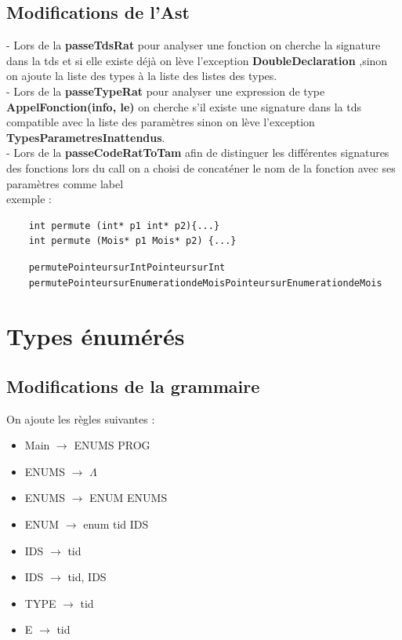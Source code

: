 \documentclass{article}
\begin{document}
\subsection{Modifications de l'Ast}
- Lors de la \textbf{passeTdsRat} pour analyser une fonction on cherche la signature dans la tds et si elle existe déjà on lève l'exception \textbf{DoubleDeclaration}
,sinon on ajoute la liste des types à la liste des listes des types. \\
- Lors de la \textbf{passeTypeRat} pour analyser une expression de type \textbf{AppelFonction(info, le)} on cherche s'il existe une signature dans la tds
compatible avec la liste des paramètres sinon on lève l'exception \textbf{TypesParametresInattendus}. \\
- Lors de la \textbf{passeCodeRatToTam} afin de distinguer les différentes signatures des fonctions lors du call on a choisi de concaténer le nom de la fonction avec ses 
paramètres comme label\\
exemple : 
\begin{verbatim}
    int permute (int* p1 int* p2){...}
    int permute (Mois* p1 Mois* p2) {...}
\end{verbatim}
\begin{verbatim}
    permutePointeursurIntPointeursurInt
    permutePointeursurEnumerationdeMoisPointeursurEnumerationdeMois
\end{verbatim}
\section{Types énumérés}
\subsection{Modifications de la grammaire}
On ajoute les règles suivantes :
\begin{itemize}
    \item Main $\rightarrow$ ENUMS PROG
    \item ENUMS $\rightarrow$ $\Lambda$
    \item ENUMS $\rightarrow$ ENUM ENUMS
    \item ENUM $\rightarrow$ enum tid {IDS}
    \item IDS $\rightarrow$ tid
    \item IDS $\rightarrow$ tid, IDS
    \item TYPE $\rightarrow$ tid
    \item E $\rightarrow$ tid
\end{itemize}
\end{document}
